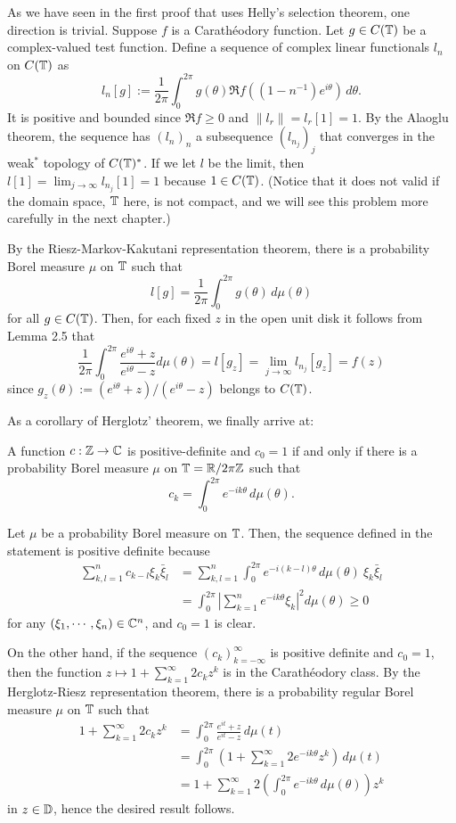 \documentclass[12pt]{article}
\begin{document}
\begin{pf}
As we have seen in the first proof that uses Helly's selection theorem, one direction is trivial.
Suppose $f$ is a Carath\'eodory function.
Let $g\in C(\mathbb{T})$ be a complex-valued test function.
Define a sequence of complex linear functionals $l_n$ on $C(\mathbb{T})$ as
\[l_n[g]:=\frac1{2\pi}\int_0^{2\pi}g(\theta)\Re f((1-n^{-1})e^{i\theta})\,d\theta.\]
It is positive and bounded since $\Re f\ge0$ and $\|l_r\|=l_r[1]=1$.
By the Alaoglu theorem, the sequence has $(l_n)_n$ a subsequence $(l_{n_j})_j$ that converges in the weak$^*$ topology of $C(\mathbb{T})^*$.
If we let $l$ be the limit, then $l[1]=\lim_{j\to\infty}l_{n_j}[1]=1$ because $1\in C(\mathbb{T})$.
(Notice that it does not valid if the domain space, $\mathbb{T}$ here, is not compact, and we will see this problem more carefully in the next chapter.)

By the Riesz-Markov-Kakutani representation theorem, there is a probability Borel measure $\mu$ on $\mathbb{T}$ such that
\[l[g]=\frac1{2\pi}\int_0^{2\pi}g(\theta)\,d\mu(\theta)\]
for all $g\in C(\mathbb{T})$.
Then, for each fixed $z$ in the open unit disk it follows from Lemma 2.5 that
\[\frac1{2\pi}\int_0^{2\pi}\frac{e^{i\theta}+z}{e^{i\theta}-z}d\mu(\theta)=l[g_z]=\lim_{j\to\infty}l_{n_j}[g_z]=f(z)\]
since $g_z(\theta):=(e^{i\theta}+z)/(e^{i\theta}-z)$ belongs to $C(\mathbb{T})$.
\end{pf}

As a corollary of Herglotz' theorem, we finally arrive at:

\begin{cor}
A function $c:\mathbb{Z}\to\mathbb{C}$ is positive-definite and $c_0=1$ if and only if there is a probability Borel measure $\mu$ on $\mathbb{T}=\mathbb{R}/2\pi\mathbb{Z}$ such that
\[c_k=\int_0^{2\pi}e^{-ik\theta}\,d\mu(\theta).\]
\end{cor}
\begin{pf}
Let $\mu$ be a probability Borel measure on $\mathbb{T}$.
Then, the sequence defined in the statement is positive definite because
\begin{align*}
\sum_{k,l=1}^nc_{k-l}\xi_k\bar\xi_l
&=\sum_{k,l=1}^n\int_0^{2\pi}e^{-i(k-l)\theta}\,d\mu(\theta)\ \xi_k\bar\xi_l\\
&=\int_0^{2\pi}\left|\sum_{k=1}^ne^{-ik\theta}\xi_k\right|^2d\mu(\theta)\ge0
\end{align*}
for any $(\xi_1,\cdots,\xi_n)\in\mathbb{C}^n$, and $c_0=1$ is clear.

On the other hand, if the sequence $(c_k)_{k=-\infty}^\infty$ is positive definite and $c_0=1$, then the function $z\mapsto1+\sum_{k=1}^\infty2c_kz^k$ is in the Carath\'eodory class.
By the Herglotz-Riesz representation theorem, there is a probability regular Borel measure $\mu$ on $\mathbb{T}$ such that
\begin{align*}
1+\sum_{k=1}^\infty2c_kz^k
&=\int_0^{2\pi}\frac{e^{it}+z}{e^{it}-z}\,d\mu(t)\\
&=\int_0^{2\pi}\left(1+\sum_{k=1}^\infty2e^{-ik\theta}z^k\right)\,d\mu(t)\\
&=1+\sum_{k=1}^\infty2\left(\int_0^{2\pi}e^{-ik\theta}\,d\mu(\theta)\right)z^k
\end{align*}
in $z\in\mathbb{D}$, hence the desired result follows.
\end{pf}
\end{document}
